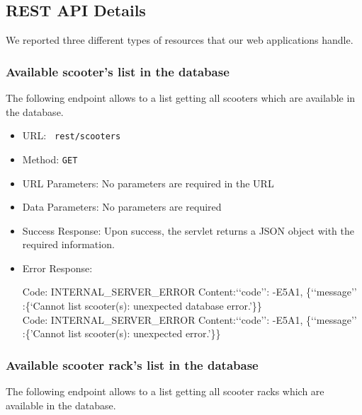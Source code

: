 
\subsection{REST API Details}

We reported three different types of resources that our web applications handle.

\subsubsection*{ Available scooter's list in the database}
The following endpoint allows to a list getting all scooters which are available in the database.

\begin{itemize}
    \item URL: \texttt{ rest/scooters}
    \item Method: \texttt{GET}
    \item URL Parameters: No parameters are required in the URL
    \item Data Parameters: No parameters are required
    \item Success Response: Upon success, the servlet returns a JSON object with the required information.
    \item Error Response:
    
Code: INTERNAL\_SERVER\_ERROR \newline
Content:‘‘code’’: -E5A1, \{‘‘message’’ :\{‘Cannot list scooter(s): unexpected database error.'\}\} \\
Code: INTERNAL\_SERVER\_ERROR \newline
Content:‘‘code’’: -E5A1, \{‘‘message’’ :\{'Cannot list scooter(s): unexpected error.'\}\}
    
\end{itemize}

\subsubsection*{ Available scooter rack's list in the database}
The following endpoint allows to a list getting all scooter racks which are available in the database.


